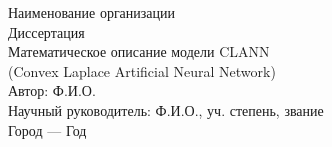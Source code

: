 \thispagestyle{empty}
\begin{center}
\Large Наименование организации\\[10pt]
\large Диссертация\\[24pt]
\LARGE Математическое описание модели CLANN\\[6pt]
\Large (Convex Laplace Artificial Neural Network)\\[24pt]
\large Автор: Ф.И.О.\\[6pt]
Научный руководитель: Ф.И.О., уч. степень, звание\\[24pt]
Город — Год
\end{center}
\newpage


